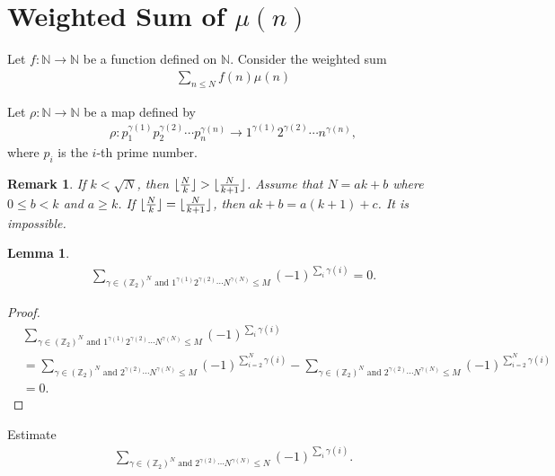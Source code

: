 \documentclass[a4paper,10pt]{amsart}
\newtheorem{lemma}{Lemma}[section]
\newtheorem{remark}{Remark}[section]
\newcommand{\Z}{\mathbb Z} %
\newcommand{\N}{\mathbb N} %
\DeclarePairedDelimiter\floor{\lfloor}{\rfloor}
\begin{document}
\section{Weighted Sum of $\mu(n)$}

Let $f: \N \rightarrow \N$ be a function defined on $\N$.
Consider the weighted sum
\begin{align*}
    \sum_{n \leq N}f(n)\mu(n) 
\end{align*}

Let $\rho: \N \rightarrow \N$ be a map defined by
\begin{align*}
\rho : p_{1}^{\gamma(1)}p_{2}^{\gamma(2)}\cdots p_{n}^{\gamma(n)} 
\rightarrow
1^{\gamma(1)}2^{\gamma(2)}\cdots n^{\gamma(n)}, 
\end{align*}
where $p_i$ is the $i$-th prime number.

\begin{remark}
    If $k< \sqrt{N}$, then $\floor{\frac{N}{k}} > \floor{\frac{N}{k+1}}$. 
    Assume that $N = ak + b$ where $0 \leq b < k$ and $a \geq k$. 
    If $\floor{\frac{N}{k}} = \floor{\frac{N}{k+1}}$, then
    $ak+ b = a(k+1)+c$. It is impossible.
\end{remark}

\begin{lemma}
 \begin{align*}
    \sum_{\gamma \in (\Z_{2})^{N} \mbox{ and } 
    1^{\gamma(1)}2^{\gamma(2)}\cdots N^{\gamma(N)} \leq M} 
    (-1)^{\sum_{i}\gamma(i)} = 0.
\end{align*}
\end{lemma}

\begin{proof}
  \begin{align*}
    &\sum_{\gamma \in (\Z_{2})^{N} \mbox{ and } 
    1^{\gamma(1)}2^{\gamma(2)}\cdots N^{\gamma(N)} \leq M} 
    (-1)^{\sum_{i}\gamma(i)} \\
    & = \sum_{\gamma \in (\Z_{2})^{N} \mbox{ and } 
    2^{\gamma(2)}\cdots N^{\gamma(N)} \leq M} 
    (-1)^{\sum_{i=2}^{N}\gamma(i)}
    - \sum_{\gamma \in (\Z_{2})^{N} \mbox{ and } 
    2^{\gamma(2)}\cdots N^{\gamma(N)} \leq M} 
    (-1)^{\sum_{i=2}^{N}\gamma(i)} \\
    &= 0.
\end{align*}
\end{proof}

Estimate
 \begin{align*}
    \sum_{\gamma \in (\Z_{2})^{N} \mbox{ and } 
    2^{\gamma(2)}\cdots N^{\gamma(N)} \leq N} 
    (-1)^{\sum_{i}\gamma(i)}.
\end{align*}
\end{document}
